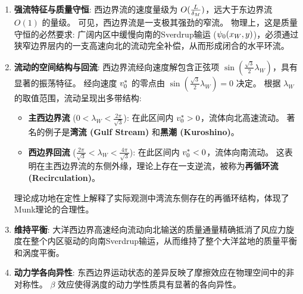 \begin{insightbox}[Munk理论的物理图景]
    \begin{enumerate}
        \item \textbf{强流特征与质量守恒}:
        西边界流的速度量级为 $O(\frac{L}{\delta_M})$，远大于东边界流 $O(1)$ 的量级。
        可见，西边界流是一支极其强劲的窄流。
        物理上，这是质量守恒的必然要求: 广阔内区中缓慢向南的Sverdrup输运 ($\psi_0(x_W, y)$)，必须通过狭窄边界层内的一支高速向北的流动完全补偿，从而形成闭合的水平环流。

        \item \textbf{流动的空间结构与回流}:
        西边界流经向速度解包含正弦项 $\sin(\frac{\sqrt{3}}{2}\lambda_W)$，具有显著的振荡特征。
        经向速度 $v_0^*$ 的零点由 $\sin(\frac{\sqrt{3}}{2}\lambda_W) = 0$ 决定。
        根据 $\lambda_W$ 的取值范围，流动呈现出多带结构:
        \begin{itemize}
            \item \textbf{主西边界流} ($0 < \lambda_W < \frac{2\pi}{\sqrt{3}}$):
            在此区间内 $v_0^* > 0$，流体向北高速流动。
            著名的例子是\textbf{湾流 (Gulf Stream)} 和\textbf{黑潮 (Kuroshino)}。

            \item \textbf{西边界回流} ($\frac{2\pi}{\sqrt{3}} < \lambda_W < \frac{4\pi}{\sqrt{3}}$):
            在此区间内 $v_0^* < 0$，流体向南流动。
            这表明在主西边界流的东侧外缘，理论上存在一支逆流，被称为\textbf{再循环流 (Recirculation)}。
        \end{itemize}
        理论成功地在定性上解释了实际观测中湾流东侧存在的再循环结构，体现了Munk理论的合理性。

        \item \textbf{维持平衡}:
        大洋西边界高速经向流动向北输送的质量通量精确抵消了风应力旋度在整个内区驱动的向南Sverdrup输运，从而维持了整个大洋盆地的质量平衡和涡度平衡。

        \item \textbf{动力学各向异性}:
        东西边界运动状态的差异反映了摩擦效应在物理空间中的非对称性。
        $\beta$ 效应使得涡度的动力学性质具有显著的各向异性。
    \end{enumerate}
\end{insightbox}
